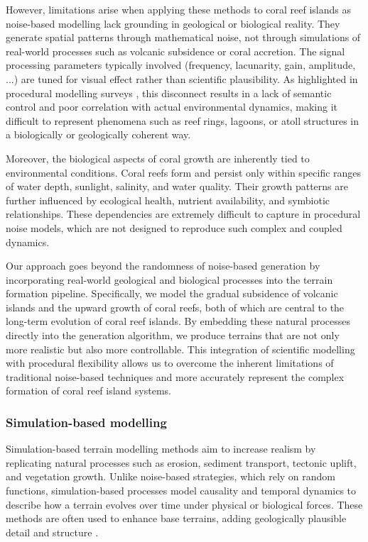 However, limitations arise when applying these methods to coral reef islands as noise-based modelling lack grounding in geological or biological reality. They generate spatial patterns through mathematical noise, not through simulations of real-world processes such as volcanic subsidence or coral accretion. The signal processing parameters typically involved (frequency, lacunarity, gain, amplitude, ...) are tuned for visual effect rather than scientific plausibility. As highlighted in procedural modelling surveys \cite{Smelik2009,Galin2019}, this disconnect results in a lack of semantic control and poor correlation with actual environmental dynamics, making it difficult to represent phenomena such as reef rings, lagoons, or atoll structures in a biologically or geologically coherent way.

Moreover, the biological aspects of coral growth are inherently tied to environmental conditions. Coral reefs form and persist only within specific ranges of water depth, sunlight, salinity, and water quality. Their growth patterns are further influenced by ecological health, nutrient availability, and symbiotic relationships. These dependencies are extremely difficult to capture in procedural noise models, which are not designed to reproduce such complex and coupled dynamics.

Our approach goes beyond the randomness of noise-based generation by incorporating real-world geological and biological processes into the terrain formation pipeline. Specifically, we model the gradual subsidence of volcanic islands and the upward growth of coral reefs, both of which are central to the long-term evolution of coral reef islands. By embedding these natural processes directly into the generation algorithm, we produce terrains that are not only more realistic but also more controllable. This integration of scientific modelling with procedural flexibility allows us to overcome the inherent limitations of traditional noise-based techniques and more accurately represent the complex formation of coral reef island systems.

\subsubsection{Simulation-based modelling}

Simulation-based terrain modelling methods aim to increase realism by replicating natural processes such as erosion, sediment transport, tectonic uplift, and vegetation growth. Unlike noise-based strategies, which rely on random functions, simulation-based processes model causality and temporal dynamics to describe how a terrain evolves over time under physical or biological forces. These methods are often used to enhance base terrains, adding geologically plausible detail and structure \cite{Benes2006, Smelik2009}.

